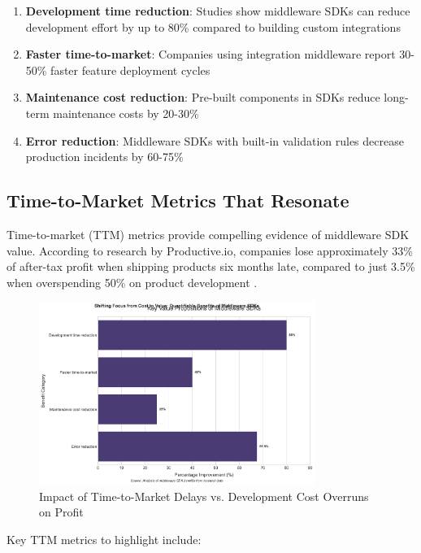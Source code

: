 \documentclass[11pt,a4paper]{article}
\begin{document}
\begin{enumerate}
    \item \textbf{Development time reduction}: Studies show middleware SDKs can reduce development effort by up to 80\% compared to building custom integrations \cite{prismatic2023}
    \item \textbf{Faster time-to-market}: Companies using integration middleware report 30-50\% faster feature deployment cycles \cite{aws2023}
    \item \textbf{Maintenance cost reduction}: Pre-built components in SDKs reduce long-term maintenance costs by 20-30\% \cite{haveignition2023}
    \item \textbf{Error reduction}: Middleware SDKs with built-in validation rules decrease production incidents by 60-75\% \cite{haveignition2023}
\end{enumerate}

\subsection{Time-to-Market Metrics That Resonate}

Time-to-market (TTM) metrics provide compelling evidence of middleware SDK value. According to research by Productive.io, companies lose approximately 33\% of after-tax profit when shipping products six months late, compared to just 3.5\% when overspending 50\% on product development \cite{productive2023}.

\begin{figure}[htbp]
    \centering
    \includegraphics[width=0.8\textwidth]{figures/visualization-20250509161535.png}
    \caption{Impact of Time-to-Market Delays vs. Development Cost Overruns on Profit}
    \label{fig:ttm-impact}
\end{figure}

Key TTM metrics to highlight include:
\end{document}
